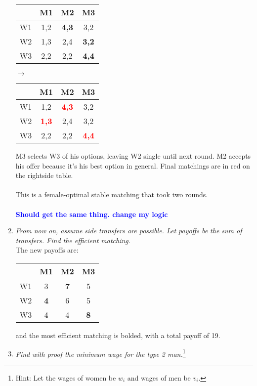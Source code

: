 \documentclass[]{article}
\newcommand{\fix} [1] {\textbf{\textcolor{blue}{#1}}} %
\begin{document}
\begin{enumerate}[label = (\alph*)]
\begin{center}
\begin{tabular}{|c|c|c|c|}
\hline 
               & M1 & M2 & M3 \\ 
\hline 
W1 & 1,2 & \textbf{4,3} & 3,2 \\ 
\hline 
W2 & 1,3 & 2,4 & \textbf{3,2} \\ 
\hline 
W3 & 2,2 & 2,2 & \textbf{4,4} \\ 
\hline 
\end{tabular} 
$\longrightarrow$
\begin{tabular}{|c|c|c|c|}
\hline 
               & M1 & M2 & M3 \\ 
\hline 
W1 & 1,2 & \textbf{\textcolor{red}{4,3}} & 3,2 \\ 
\hline 
W2 & \textbf{\textcolor{red}{1,3}} & 2,4 & 3,2 \\ 
\hline 
W3 & 2,2 & 2,2 & \textbf{\textcolor{red}{4,4}} \\ 
\hline 
\end{tabular} 
\end{center}
M3 selects W3 of his options, leaving W2 single until next round. M2 accepts his offer because it's his best option in general. Final matchings are in red on the rightside table.\\
\\

This is a female-optimal stable matching that took two rounds. 
\\\\
\fix{Should get the same thing. change my logic}


\item \textit{From now on,  assume side transfers are possible.  Let payoffs be the sum of transfers.  Find the efficient matching.} \\
The new payoffs are:

\begin{center}
\begin{tabular}{|c|c|c|c|}
\hline 
      & M1 & M2 & M3 \\ 
\hline 
W1 & 3 & \textbf{7} & 5 \\ 
\hline 
W2 & \textbf{4} & 6 & 5 \\ 
\hline 
W3 & 4 & 4 & \textbf{8} \\ 
\hline 
\end{tabular} 
\end{center}
and the most efficient matching is bolded, with a total payoff of 19.

\item \textit{Find with proof the minimum wage for the type 2 man.}\footnote{Hint: Let the wages of women be $w_i$ and wages of men be $v_i$.}

\end{enumerate}
\end{document}
